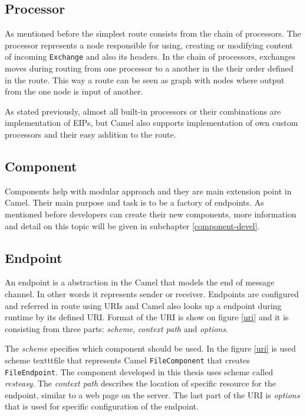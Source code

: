 \documentclass[12pt,final,oneside]{fithesis2}
\begin{document}
\subsection*{Processor}
As mentioned before the simplest route consists from the chain of processors. The processor represents a node responsible for using, creating or modifying content of incoming \texttt{Exchange} and also its headers. In the chain of processors, exchanges moves during routing from one processor to a another in the their order defined in the route. This way a route can be seen as graph with nodes where output from the one node is input of another.

As stated previously, almost all built-in processors or their combinations are implementation of EIPs, but Camel also supports implementation of own custom processors and their easy addition to the route.

\subsection*{Component}
Components help with modular approach and they are main extension point in Camel. Their main purpose and task is to be a factory of endpoints. As mentioned before developers can create their new components, more information and detail on this topic will be given in subchapter \ref{component-devel}. 

\subsection*{Endpoint}
An endpoint is a abstraction in the Camel that models the end of message channel. In other words it represents sender or receiver. Endpoints are configured and referred in route using URIs and Camel also looks up a endpoint during runtime by its defined URI. Format of the URI is show on figure \ref{uri} and it is consisting from three parts: \textit{scheme}, \textit{context path} and \textit{options}. 

The \textit{scheme} specifies which component should be used. In the figure \ref{uri} is used scheme texttt{file} that represents Camel \texttt{FileComponent} that creates \texttt{FileEndpoint}. The component developed in this thesis uses scheme called \textit{resteasy}. The \textit{context path} describes the location of specific resource for the endpoint, similar to a web page on the server. The last part of the URI is \textit{options} that is used for specific configuration of the endpoint.
\end{document}
